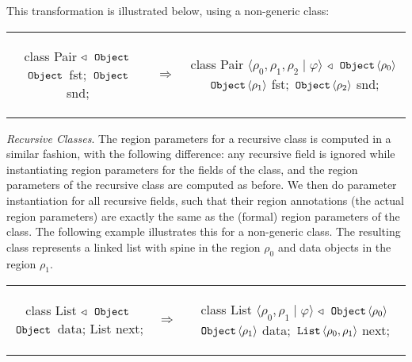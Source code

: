 This transformation is illustrated below, using a non-generic  class:

\begin{tabular}{ccc}
\begin{minipage}{0.28\linewidth}
\begin{codejava}
class Pair
  $\triangleleft$ $\,{\tt Object}\,$
{
  $\,{\tt Object}\,$ fst;
  $\,{\tt Object}\,$ snd;
}
\end{codejava}
\end{minipage}
&
$\Rightarrow$
&
\begin{minipage}{0.5\linewidth}
\begin{codejava}
class Pair $\langle \rho_0, \rho_1, \rho_2 \; | \; \varphi \rangle$
  $\triangleleft$ $\,{\tt Object}\, \langle \rho_0 \rangle$
{
  $\,{\tt Object}\, \langle \rho_1 \rangle$ fst;
  $\,{\tt Object}\, \langle \rho_2 \rangle$ snd;
}
\end{codejava}
\end{minipage}
\end{tabular}

\emph{Recursive Classes}.
The region parameters for a recursive class is computed in
a similar fashion, with the following difference: any recursive
field is ignored while instantiating region parameters for the fields of
the class, and the region parameters of the recursive class are computed
as before. We then do parameter instantiation for all recursive fields,
such that their region annotations (the actual region parameters) are
exactly the same as the (formal) region parameters of the class.
The following example illustrates this for a non-generic  class.
The resulting class represents a linked list with spine in the region
$\rho_0$ and data objects in the region $\rho_1$.

\begin{tabular}{ccc}
\begin{minipage}{0.28\linewidth}
\begin{codejava}
class List
  $\triangleleft$ $\,{\tt Object}\,$
{
  $\,{\tt Object}\,$ data;
  List next;
}
\end{codejava}
\end{minipage}
&
$\Rightarrow$
&
\begin{minipage}{0.5\linewidth}
\begin{codejava}
class List $\langle \rho_0, \rho_1 \; | \; \varphi \rangle$
  $\triangleleft$ $\,{\tt Object}\, \langle \rho_0 \rangle$
{
  $\,{\tt Object}\, \langle \rho_1 \rangle$ data;
  $\,{\tt List}\, \langle \rho_0, \rho_1 \rangle$ next;
}
\end{codejava}
\end{minipage}
\end{tabular}

